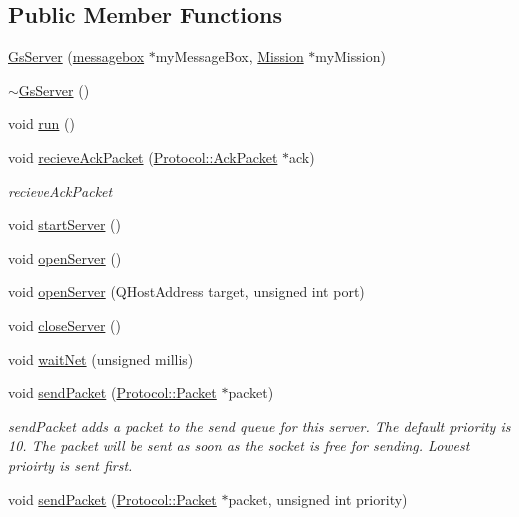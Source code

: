\subsection*{Public Member Functions}
\begin{DoxyCompactItemize}
\item 
\hyperlink{class_gs_server_a0931c5e470fcb46548c14996d2d9c853}{Gs\+Server} (\hyperlink{classmessagebox}{messagebox} $\ast$my\+Message\+Box, \hyperlink{class_mission}{Mission} $\ast$my\+Mission)
\item 
\hyperlink{class_gs_server_a56461ff8c405720a8cb591c84f61a5bf}{$\sim$\+Gs\+Server} ()
\item 
void \hyperlink{class_gs_server_aa906d6a7084c03849eadcd31563057e6}{run} ()
\item 
void \hyperlink{class_gs_server_abfbbae94e647cc6415b3a460fbabec88}{recieve\+Ack\+Packet} (\hyperlink{class_protocol_1_1_ack_packet}{Protocol\+::\+Ack\+Packet} $\ast$ack)
\begin{DoxyCompactList}\small\item\em recieve\+Ack\+Packet \end{DoxyCompactList}\item 
void \hyperlink{class_gs_server_a394e75ea0a17eb9a6ac2814ea84b250c}{start\+Server} ()
\item 
void \hyperlink{class_gs_server_a6f73b66c39e5080eb58c80ab355d3c8c}{open\+Server} ()
\item 
void \hyperlink{class_gs_server_aa2acb9071c6c2ef44f5a8fc859576ff6}{open\+Server} (Q\+Host\+Address target, unsigned int port)
\item 
void \hyperlink{class_gs_server_a7ca468b85231e88da9b5cafb1320bbb4}{close\+Server} ()
\item 
void \hyperlink{class_gs_server_a5be5b957f9207e66550fc33fbf2b4df2}{wait\+Net} (unsigned millis)
\item 
void \hyperlink{class_gs_server_ae8e04868caa920485facfc4cfda6291e}{send\+Packet} (\hyperlink{class_protocol_1_1_packet}{Protocol\+::\+Packet} $\ast$packet)
\begin{DoxyCompactList}\small\item\em send\+Packet adds a packet to the send queue for this server. The default priority is 10. The packet will be sent as soon as the socket is free for sending. Lowest prioirty is sent first. \end{DoxyCompactList}\item 
void \hyperlink{class_gs_server_a3a07e46c4042ff43336ffcafa36f2a3a}{send\+Packet} (\hyperlink{class_protocol_1_1_packet}{Protocol\+::\+Packet} $\ast$packet, unsigned int priority)

\end{DoxyCompactItemize}

